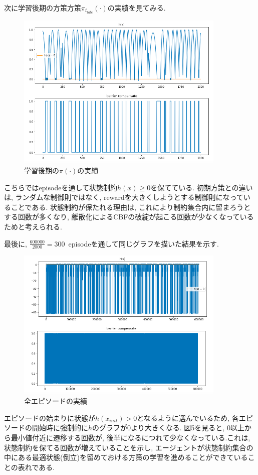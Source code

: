 \documentclass{jsarticle}
\begin{document}
次に学習後期の方策方策$\pi_{t_{late}}(\cdot)$の実績を見てみる. 
\begin{figure}[h]
	\centering
 	\includegraphics[width=10cm]{good_policy.png}
 	\caption{学習後期の$\pi(\cdot)$の実績}
\end{figure}\par
こちらではepisodeを通して状態制約$h(x)\geq 0$を保てている. 初期方策との違いは, ランダムな制御則ではなく, rewardを大きくしようとする制御則になっていることである. 状態制約が保たれる理由は, これにより制約集合内に留まろうとする回数が多くなり, 離散化によるCBFの破綻が起こる回数が少なくなっているためと考えられる.\par

最後に, $\frac{600000}{2000} = 300$~episodeを通して同じグラフを描いた結果を示す. \par
\begin{figure}[h]
	\centering
 	\includegraphics[width=10cm]{all_policies.png}
 	\caption{全エピソードの実績}
\end{figure}\par

エピソードの始まりに状態が$h(x_{init})>0$となるように選んでいるため, 各エピソードの開始時に強制的に$h$のグラフが0より大きくなる. 図5を見ると, 0以上から最小値付近に遷移する回数が, 後半になるにつれて少なくなっている.これは, 状態制約を保てる回数が増えていることを示し, エージェントが状態制約集合の中にある最適状態(倒立)を留めておける方策の学習を進めることができていることの表れである. \par
\end{document}
